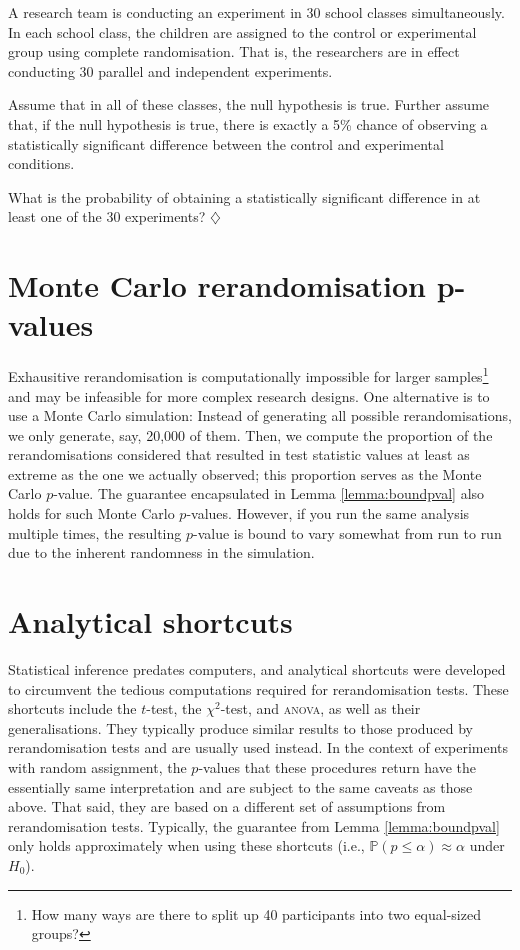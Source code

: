 \documentclass[a4paper]{tufte-book}\usepackage[]{graphicx}\usepackage[]{xcolor}
\newcommand*{\parend}[1][$\diamondsuit$]{%
\leavevmode\unskip\penalty9999 \hbox{}\nobreak\hfill
    \quad\hbox{#1}%
}
\begin{document}
\label{ex:multipletesting}
A research team is conducting an experiment in 30 school classes
        simultaneously. In each school class, the children are assigned
        to the control or experimental group using complete randomisation.
        That is, the researchers are in effect conducting 30 parallel and
        independent experiments.

        Assume that in all of these classes, the null hypothesis is true.
        Further assume that, if the null hypothesis is true, there is
        exactly a 5\% chance of observing a statistically significant difference between
        the control and experimental conditions.

        What is the probability of obtaining a statistically significant
        difference in at least one of the 30 experiments?
\parend

\section{Monte Carlo rerandomisation p-values}
Exhausitive rerandomisation is computationally impossible for larger samples\footnote{How many ways are there to split up 40 participants into two equal-sized groups?} 
and may be infeasible for more complex research designs.
One alternative is to use a Monte Carlo simulation:
Instead of generating all possible rerandomisations, we only generate, say, 20,000 of them.
Then, we compute the proportion of the rerandomisations considered that resulted
in test statistic values at least as extreme as the one we actually observed;
this proportion serves as the Monte Carlo $p$-value.
The guarantee encapsulated in Lemma \ref{lemma:boundpval} also holds for
such Monte Carlo $p$-values.
However, if you run the same analysis multiple times, 
the resulting $p$-value is bound to vary somewhat from run to run 
due to the inherent randomness in the simulation.

\section{Analytical shortcuts}
Statistical inference predates computers, and analytical shortcuts were developed
to circumvent the tedious computations required for rerandomisation tests.
These shortcuts include the $t$-test, the $\chi^2$-test, and \textsc{anova}, 
as well as their generalisations.
They typically produce similar results to those produced by rerandomisation tests
and are usually used instead.
In the context of experiments with random assignment,
the $p$-values that these procedures return have
the essentially same interpretation and are subject to the same caveats as those above.
That said, they are based on a different set of assumptions from rerandomisation tests.
Typically,
the guarantee from Lemma \ref{lemma:boundpval} only holds approximately
when using these shortcuts
(i.e., $\mathbb{P}(p \leq \alpha) \approx \alpha$ under $H_0$).
\end{document}
